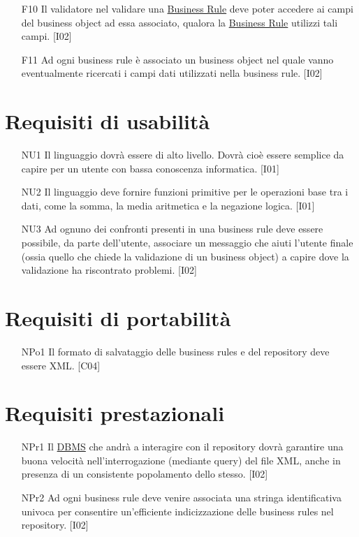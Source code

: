\begin{itemize}
\item[F10]{Il validatore nel validare una \underline{Business Rule} deve poter accedere ai campi del business object ad essa associato, qualora la \underline{Business Rule} utilizzi tali campi. [I02]}
\item[F11]{Ad ogni business rule \`e associato un business object nel quale vanno eventualmente ricercati i campi dati utilizzati nella business rule. [I02]}
\end{itemize}

\section{Requisiti di usabilit\`a}
\begin{itemize}
\item[NU1]{Il linguaggio dovr\`a essere di alto livello. Dovr\`a cio\`e essere semplice da capire per un utente con bassa conoscenza informatica. [I01]}
\item[NU2]{Il linguaggio deve fornire funzioni primitive per le operazioni base tra i dati, come la somma, la media aritmetica e la negazione logica. [I01]}
\item[NU3]{Ad ognuno dei confronti presenti in una business rule deve essere possibile, da parte dell'utente, associare un messaggio che aiuti l'utente finale (ossia quello che chiede la validazione di un business object) a capire dove la validazione ha riscontrato problemi. [I02]}
\end{itemize}

\section{Requisiti di portabilit\`a}
\begin{itemize}
\item[NPo1]{Il formato di salvataggio delle business rules e del repository deve essere XML. [C04]}
\end{itemize}
\section{Requisiti prestazionali}
\begin{itemize}
 \item[NPr1]{Il \underline{DBMS} che andr\`a a interagire con il repository dovr\`a garantire una buona velocit\`a nell'interrogazione (mediante query) del file XML, anche in presenza di un consistente popolamento dello stesso. [I02]}
\item[NPr2]{Ad ogni business rule deve venire associata una stringa identificativa univoca per consentire un'efficiente indicizzazione delle business rules nel repository. [I02]}
\end{itemize}

